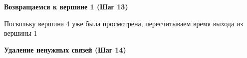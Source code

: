 \documentclass[a4paper]{article}
\begin{document}
\textbf{Возвращаемся к вершине 1 (Шаг 13)}
  \begin{figure}[!h]
  \end{figure}
\par
  Поскольку вершина 4 уже была просмотрена, пересчитываем время выхода из вершины 1\par
\newpage

\textbf{Удаление ненужных связей (Шаг 14)}
  \begin{figure}[!h]
  \end{figure}
\newpage
\end{document}

